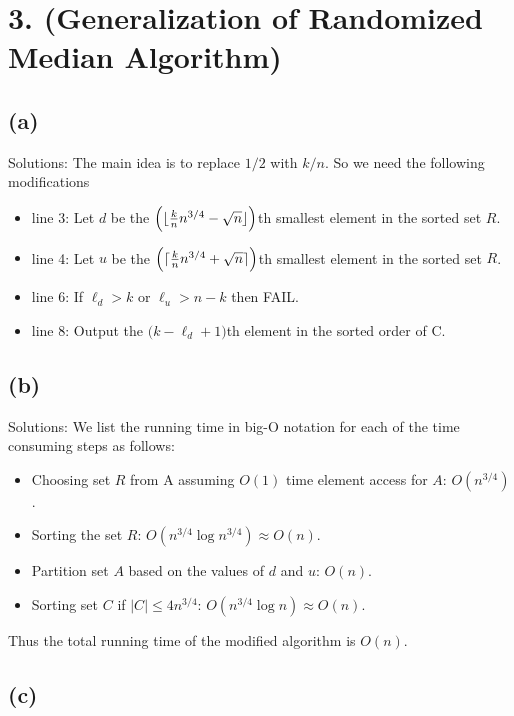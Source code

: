 \documentclass[11pt]{537homework}
\author{Peilun Dai}
\begin{document}
\section*{3. (Generalization of Randomized Median Algorithm) }



\subsection*{(a)}

Solutions: The main idea is to replace $1/2$ with $k/n$. So we need the following modifications
\begin{itemize}
  \item line 3: Let $d$ be the $\Big( \lfloor {k \over n}n^{3/4} - \sqrt{n} \rfloor \Big)$th smallest element in the sorted set $R$.
  \item line 4: Let $u$ be the $\Big( \lceil {k \over n}n^{3/4} + \sqrt{n} \rceil \Big)$th smallest element in the sorted set $R$.
  \item line 6: If $\ell_d > k$ or $\ell_u > n-k$ then FAIL. 
  \item line 8: Output the $\big( k - \ell_d + 1 \big)$th element in the sorted order of C. 
\end{itemize}



\subsection*{(b)}

Solutions: We list the running time in big-O notation for each of the time consuming steps as follows:

\begin{itemize}
  \item Choosing set $R$ from A assuming $O(1)$ time element access for $A$: $O(n^{3/4})$.
  \item Sorting the set $R$: $O(n^{3/4} \log{n^{3/4}}) \approx O(n)$.
  \item Partition set $A$ based on the values of $d$ and $u$: $O(n)$.
  \item Sorting set $C$ if $|C| \leq 4n^{3/4}$: $O(n^{3/4}\log{n}) \approx O(n)$. 
\end{itemize}
Thus the total running time of the modified algorithm is $O(n)$. 


\subsection*{(c)}
\end{document}
